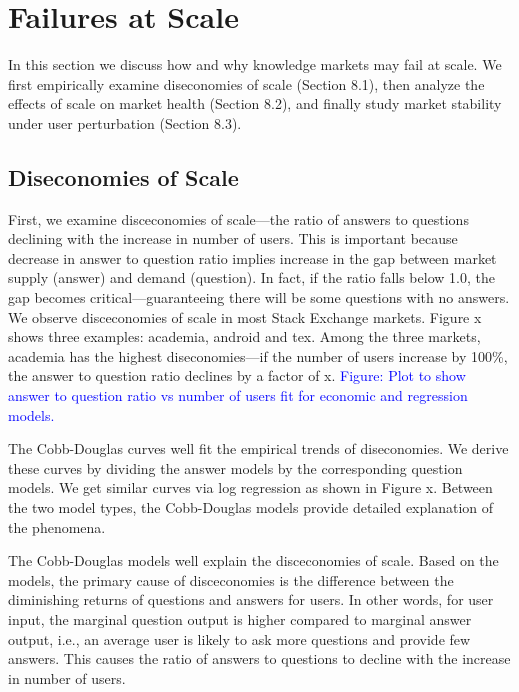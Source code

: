 \section{Failures at Scale}
In this section we discuss how and why knowledge markets may fail at scale. We first empirically examine diseconomies of scale (Section 8.1), then analyze the effects of scale on market health (Section 8.2), and finally study market stability under user perturbation (Section 8.3).

\subsection{Diseconomies of Scale}
First, we examine disceconomies of scale---the ratio of answers to questions declining with the increase in number of users. This is important because decrease in answer to question ratio implies increase in the gap between market supply (answer) and demand (question). In fact, if the ratio falls below 1.0, the gap becomes critical---guaranteeing there will be some questions with no answers. We observe disceconomies of scale in most Stack Exchange markets. Figure x shows three examples: academia, android and tex. Among the three markets, academia has the highest diseconomies---if the number of users increase by 100\%, the answer to question ratio declines by a factor of x. \textcolor{blue}{Figure: Plot to show answer to question ratio vs number of users fit for economic and regression models.}

The Cobb-Douglas curves well fit the empirical trends of diseconomies. We derive these curves by dividing the answer models by the corresponding question models. We get similar curves via log regression as shown in Figure x. Between the two model types, the Cobb-Douglas models provide detailed explanation of the phenomena.

The Cobb-Douglas models well explain the disceconomies of scale. Based on the models, the primary cause of disceconomies is the difference between the diminishing returns of questions and answers for users. In other words, for user input, the marginal question output is higher compared to marginal answer output, i.e., an average user is likely to ask more questions and provide few answers. This causes the ratio of answers to questions to decline with the increase in number of users.

